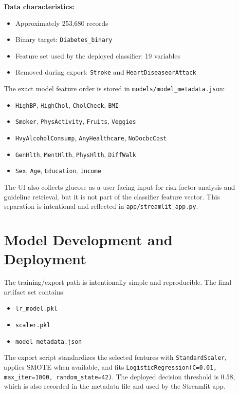 \documentclass[12pt]{article}
\begin{document}
\textbf{Data characteristics:}
\begin{itemize}
\item Approximately 253,680 records
\item Binary target: \texttt{Diabetes\_binary}
\item Feature set used by the deployed classifier: 19 variables
\item Removed during export: \texttt{Stroke} and \texttt{HeartDiseaseorAttack}
\end{itemize}

The exact model feature order is stored in \texttt{models/model\_metadata.json}:

\begin{itemize}
\item \texttt{HighBP}, \texttt{HighChol}, \texttt{CholCheck}, \texttt{BMI}
\item \texttt{Smoker}, \texttt{PhysActivity}, \texttt{Fruits}, \texttt{Veggies}
\item \texttt{HvyAlcoholConsump}, \texttt{AnyHealthcare}, \texttt{NoDocbcCost}
\item \texttt{GenHlth}, \texttt{MentHlth}, \texttt{PhysHlth}, \texttt{DiffWalk}
\item \texttt{Sex}, \texttt{Age}, \texttt{Education}, \texttt{Income}
\end{itemize}

The UI also collects glucose as a user-facing input for risk-factor analysis and guideline retrieval, but it is not part of the classifier feature vector. This separation is intentional and reflected in \texttt{app/streamlit\_app.py}.

\section{Model Development and Deployment}

The training/export path is intentionally simple and reproducible. The final artifact set contains:

\begin{itemize}
\item \texttt{lr\_model.pkl}
\item \texttt{scaler.pkl}
\item \texttt{model\_metadata.json}
\end{itemize}

The export script standardizes the selected features with \texttt{StandardScaler}, applies SMOTE when available, and fits \texttt{LogisticRegression(C=0.01, max\_iter=1000, random\_state=42)}. The deployed decision threshold is 0.58, which is also recorded in the metadata file and used by the Streamlit app.
\end{document}

